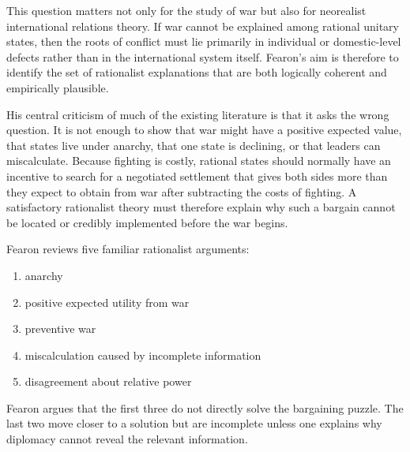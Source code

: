 This question matters not only for the study of war but also for neorealist international relations theory. If war cannot be explained among rational unitary states, then the roots of conflict must lie primarily in individual or domestic-level defects rather than in the international system itself. Fearon's aim is therefore to identify the set of rationalist explanations that are both logically coherent and empirically plausible.

His central criticism of much of the existing literature is that it asks the wrong question. It is not enough to show that war might have a positive expected value, that states live under anarchy, that one state is declining, or that leaders can miscalculate. Because fighting is costly, rational states should normally have an incentive to search for a negotiated settlement that gives both sides more than they expect to obtain from war after subtracting the costs of fighting. A satisfactory rationalist theory must therefore explain why such a bargain cannot be located or credibly implemented before the war begins.


Fearon reviews five familiar rationalist arguments:
\begin{enumerate}
    \item anarchy
    \item positive expected utility from war
    \item preventive war
    \item miscalculation caused by incomplete information
    \item disagreement about relative power
\end{enumerate}

Fearon argues that the first three do not directly solve the bargaining puzzle. The last two move closer to a solution but are incomplete unless one explains why diplomacy cannot reveal the relevant information.

